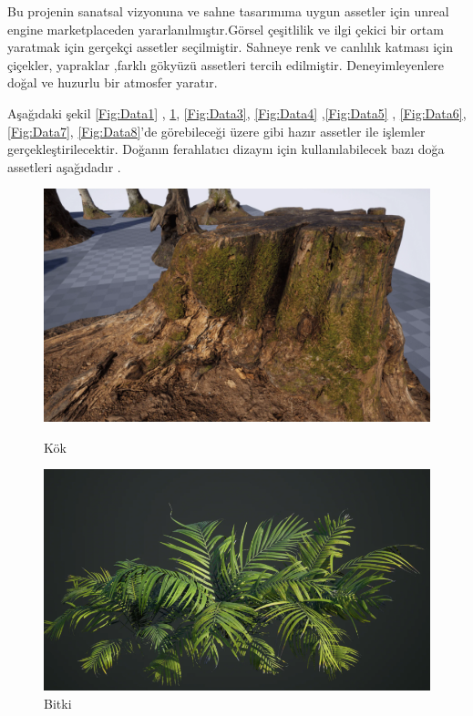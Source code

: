 \documentclass[12pt, a4paper]{article}
\begin{document}
	\vspace*{1\baselineskip}	
	Bu projenin sanatsal vizyonuna ve sahne tasarımıma uygun assetler için unreal engine marketplaceden yararlanılmıştır.Görsel çeşitlilik ve ilgi çekici bir ortam yaratmak için gerçekçi assetler seçilmiştir.
	Sahneye renk ve canlılık katması için çiçekler, yapraklar ,farklı gökyüzü assetleri tercih edilmiştir.
	Deneyimleyenlere doğal ve huzurlu bir atmosfer yaratır.
	
	Aşağıdaki şekil \ref{Fig:Data1} , \ref{Fig:Data2}, \ref{Fig:Data3}, \ref{Fig:Data4} ,\ref{Fig:Data5} , \ref{Fig:Data6}, \ref{Fig:Data7}, \ref{Fig:Data8}'de görebileceği üzere
	gibi hazır assetler ile işlemler gerçekleştirilecektir. Doğanın ferahlatıcı dizaynı için kullanılabilecek bazı doğa assetleri aşağıdadır .
	
	\begin{figure}[!htb]
		\begin{minipage}{0.48\textwidth}
			\centering
			\includegraphics[width=.7\linewidth]{root.png}
			\caption{Kök}\label{Fig:Data1}
		\end{minipage}\hfill
		\begin{minipage}{0.48\textwidth}
			\centering
			\includegraphics[width=.7\linewidth]{tropical.png}
			\caption{Bitki}\label{Fig:Data2}
		\end{minipage}
	\end{figure}
	
\end{document}
